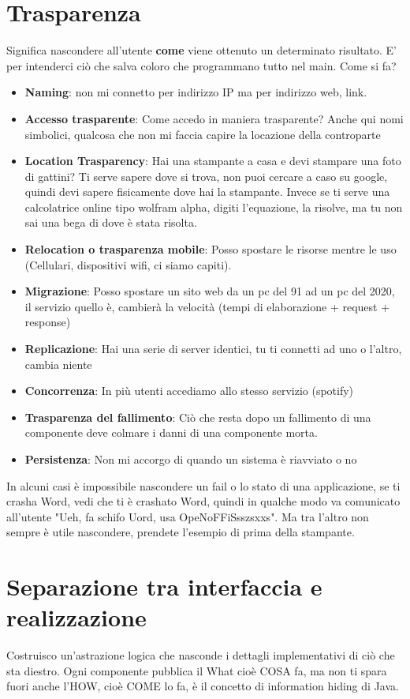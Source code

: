 \documentclass[12pt, a4paper, openany, twoside]{book}
\begin{document}
\section{Trasparenza}
Significa nascondere all'utente \textbf{come} viene ottenuto un determinato
risultato. E' per intenderci ciò che salva coloro che programmano tutto nel 
main.
Come si fa?
\begin{itemize}
	\item \textbf{Naming}: non mi connetto per indirizzo IP ma per indirizzo web, link.
	\item \textbf{Accesso trasparente}: Come accedo in maniera trasparente? Anche qui
	nomi simbolici, qualcosa che non mi faccia capire la locazione della 
	controparte
	\item \textbf{Location Trasparency}: Hai una stampante a casa e devi stampare una foto
	di gattini? Ti serve sapere dove si trova, non puoi cercare a caso su google,
	quindi devi sapere fisicamente dove hai la stampante. Invece se ti serve
	una calcolatrice online tipo wolfram alpha, digiti l'equazione, la risolve,
	ma tu non sai una bega di dove è stata risolta.
	\item \textbf{Relocation o trasparenza mobile}: Posso spostare le risorse mentre le
	uso (Cellulari, dispositivi wifi, ci siamo capiti).
	\item \textbf{Migrazione}: Posso spostare un sito web da un pc del 91 ad un pc del 
	2020, il servizio quello è, cambierà la velocità (tempi di elaborazione
	+ request + response)
	\item \textbf{Replicazione}: Hai una serie di server identici, tu ti connetti ad uno
	o l'altro, cambia niente
	\item \textbf{Concorrenza}: In più utenti accediamo allo stesso servizio (spotify)
	\item \textbf{Trasparenza del fallimento}: Ciò che resta dopo un fallimento di una
	componente deve colmare i danni di una componente morta.
	\item \textbf{Persistenza}: Non mi accorgo di quando un sistema è riavviato o no
\end{itemize}
In alcuni casi è impossibile nascondere un fail o lo stato di una applicazione,
se ti crasha Word, vedi che ti è crashato Word, quindi in qualche modo 
va comunicato all'utente "Ueh, fa schifo Uord, usa OpeNoFFiSsszsxxs". Ma
tra l'altro non sempre è utile nascondere, prendete l'esempio di prima della
stampante. 
\section{Separazione tra interfaccia e realizzazione}
Costruisco un'astrazione logica che nasconde i dettagli implementativi
di ciò che sta diestro. Ogni componente pubblica il What cioè COSA fa, ma non
ti spara fuori anche l'HOW, cioè COME lo fa, è il concetto di information
hiding di Java.
\end{document}
